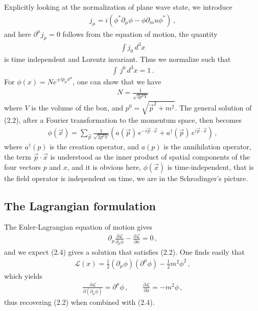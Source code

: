 \documentclass[11pt, onesided]{book}
\theoremstyle{break}
\theoremstyle{break}
\newcommand{\pd}{\partial}
\begin{document}
Explicitly looking at the normalization of plane wave state, we introduce 
\begin{align*}
j_\mu = i(\phi^* \pd_\mu \phi - \phi \pd_mu \phi^*)\,,
\end{align*}
and here $\pd^\mu j_\mu = 0$ follows from the equation of motion, the quantity 
\begin{align*}
\int j_0 \, d^3x
\end{align*}
is time independent and Lorentz invariant. Thus we normalize such that
\begin{align*}
\int\, j^0\, d^3x = 1\,.
\end{align*}
For $\phi(x) = N e^{\pm i p_\mu x^\mu}$, one can show that we have
\begin{align*}
N = \frac{1}{\sqrt{2p^0 V}}
\end{align*}
where $V$ is the volume of the box, and $p^0 = \sqrt{\vec{p}^2 + m^2}$. The general solution of (2.2), after a Fourier transformation to the momentum space, then becomes
\begin{align*}
\phi(\vec{x}) = \sum_{\vec{p}} \frac{1}{\sqrt{2p^0 V}} \left( a(\vec{p})\, e^{-i \vec{p}\cdot\vec{x}} + a^\dagger(\vec{p})\, e^{i\vec{p}\cdot\vec{x}}\right)\,,
\end{align*}
where $a^\dagger(p)$ is the creation operator, and $a(p)$ is the annihilation operator, the term $\vec{p}\cdot \vec{x}$ is understood as the inner product of spatial components of the four vectors $p$ and $x$, and it is obvious here, $\phi(\vec{x})$ is time-independent, that is the field operator is independent on time, we are in the Schrodinger's picture. 

\subsection{The Lagrangian formulation}
The Euler-Lagrangian equation of motion gives
\begin{align}
\pd_\mu \frac{\pd \mathcal{L}}{\pd_\mu \phi} - \frac{\pd \mathcal{L}}{\pd \phi} = 0\,,
\end{align}
and we expect (2.4) gives a solution that satisfies (2.2). One finds easily that
\begin{align*}
\mathcal{L}(x) = \frac{1}{2}(\pd_\mu \phi) (\pd^\mu \phi) - \frac{1}{2}m^2 \phi^2\,,
\end{align*}
which yields
\begin{align*}
\frac{\pd \mathcal{L}}{\pd (\pd_\mu \phi)} = \pd^\mu \phi \, ,\qquad
\frac{\pd \mathcal{L}}{\pd \phi} = -m^2\phi\,,
\end{align*}
thus recovering (2.2) when combined with (2.4).\\
\end{document}
